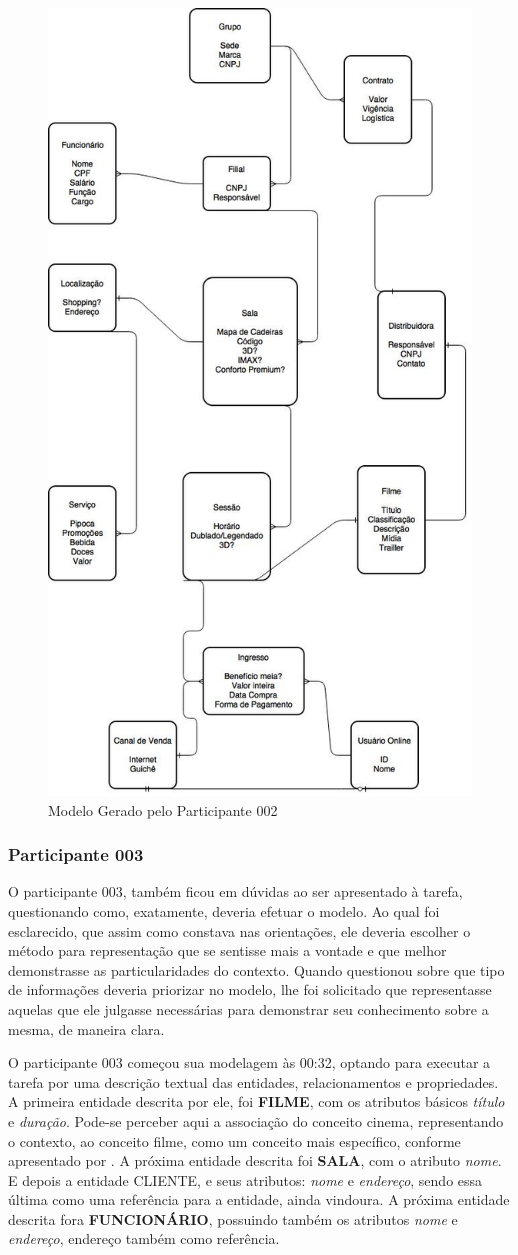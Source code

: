\begin{figure}[!ht]
    \centering
    \includegraphics[width=\textwidth, height=\textwidth]{imagens/Modelo_000_Igor.jpg}
    \caption{Modelo Gerado pelo Participante 002}
    \label{fig:Modelo_000_igor}
\end{figure}

\subsubsection{\hspace*{3pt} Participante 003}
\label{sec:participante_003}

O participante 003, também ficou em dúvidas ao ser apresentado à tarefa, questionando como, exatamente, deveria efetuar o modelo. Ao qual foi esclarecido, que assim como constava nas orientações, ele deveria escolher o método para representação que se sentisse mais a vontade e que melhor demonstrasse as particularidades do contexto. Quando questionou sobre que tipo de informações deveria priorizar no modelo, lhe foi solicitado que representasse aquelas que ele julgasse necessárias para demonstrar seu conhecimento sobre a mesma, de maneira clara.

O participante 003 começou sua modelagem às 00:32, optando para executar a tarefa por uma descrição textual das entidades, relacionamentos e propriedades. A primeira entidade descrita por ele, foi \textbf{FILME}, com os atributos básicos \textit{título} e \textit{duração}. Pode-se perceber aqui a associação do conceito cinema, representando o contexto, ao conceito filme, como um conceito mais específico, conforme apresentado por \cite{dahlberg:1978.fundamentos}. A próxima entidade descrita foi \textbf{SALA}, com o atributo \textit{nome}. E depois a entidade CLIENTE, e seus atributos: \textit{nome} e \textit{endereço}, sendo essa última como uma referência para a entidade, ainda vindoura.  A próxima entidade descrita fora \textbf{FUNCIONÁRIO}, possuindo também os atributos \textit{nome} e \textit{endereço}, endereço também como referência.

